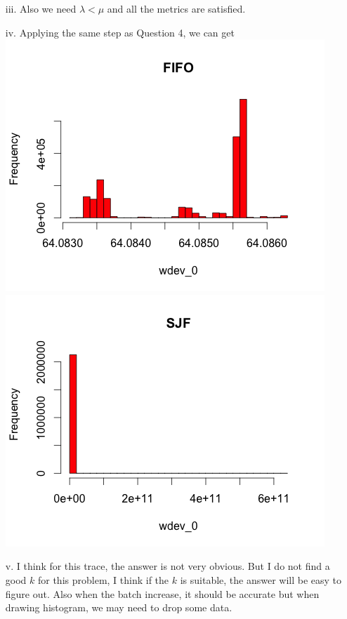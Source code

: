 \documentclass[11pt]{article}
\begin{document}
\begin{enumerate}
\begin{table}[htdp]
\begin{center}
\begin{tabular}{c|c|c|c|c}
\end{tabular}
\end{center}
\label{default}
\end{table}%
\item[iii.]
Also we need $\lambda < \mu$ and all the metrics are satisfied.
\item[iv.] 
Applying the same step as Question 4, we can get \\
\includegraphics[scale=0.5]{1_1.png}
\includegraphics[scale=0.5]{1_2.png}
\item[v.]
I think for this trace, the answer is not very obvious. But I do not find a good $k$ for this problem, I think if the $k$ is suitable, the answer will be easy to figure out. Also when the batch increase, it should be accurate but when drawing histogram, we may need to drop some data.
\end{enumerate}
\end{document}
